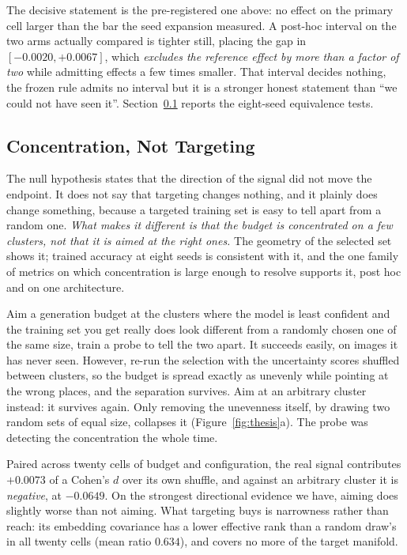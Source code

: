 \documentclass{article}
\begin{document}
The decisive statement is the pre-registered one above: no effect on the primary cell larger than the bar the seed expansion
measured. A post-hoc interval on the two arms actually compared is tighter still,
placing the gap in $[-0.0020, +0.0067]$, which \textit{excludes the reference effect by more than a
factor of two} while admitting effects a few times smaller. That interval decides nothing, the
frozen rule admits no interval but it is a stronger honest statement than ``we could not have
seen it''. Section~\ref{sec:concentration} reports the eight-seed equivalence tests.

\subsection{Concentration, Not Targeting}
\label{sec:concentration}
The null hypothesis states that the direction of the signal did not move the endpoint. It does not say that targeting
changes nothing, and it plainly does change something, because a targeted training set is easy to
tell apart from a random one. \textit{What makes it different is that the budget is concentrated on
a few clusters, not that it is aimed at the right ones.} The geometry of the selected set shows it;
trained accuracy at eight seeds is consistent with it, and the one family of metrics on which
concentration is large enough to resolve supports it, post hoc and on one architecture.

Aim a generation budget at the clusters where the model is least confident and the training set you get really does
look different from a randomly chosen one of the same size, train a probe to tell the two apart. It succeeds easily, on images it has never seen. However, re-run the selection with the uncertainty
scores shuffled between clusters, so the budget is spread exactly as unevenly while pointing at the
wrong places, and the separation survives. Aim at an arbitrary cluster instead: it survives again.
Only removing the unevenness itself, by drawing two random sets of equal size, collapses it (Figure~\ref{fig:thesis}a). The probe was detecting the concentration the whole time.

Paired across twenty cells of budget and configuration, the real signal contributes $+0.0073$ of a
Cohen's $d$ over its own shuffle, and against an arbitrary cluster it is \emph{negative}, at
$-0.0649$. On the strongest directional evidence we have, aiming does slightly worse than not
aiming. What targeting buys is narrowness rather than reach: its embedding covariance has a lower
effective rank than a random draw's in all twenty cells (mean ratio $0.634$), and covers no more of
the target manifold.
\end{document}
